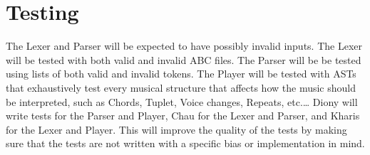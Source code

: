 \documentclass{article}
\begin{document}
\section{Testing}
The Lexer and Parser will be expected to have possibly invalid inputs.
The Lexer will be tested with both valid and invalid ABC files.
The Parser will be be tested using lists of both valid and invalid tokens.
The Player will be tested with ASTs that exhaustively test every musical structure that affects how the music should be interpreted,
such as Chords, Tuplet, Voice changes, Repeats, etc.\ldots
Diony will write tests for the Parser and Player, Chau for the Lexer and Parser, and Kharis for the Lexer and Player.
This will improve the quality of the tests by making sure that the tests are not written with a specific bias or implementation in mind.
\end{document}
